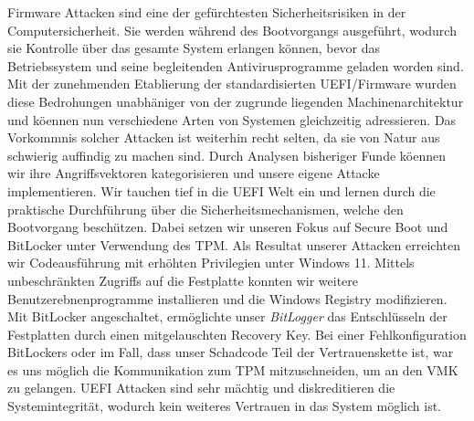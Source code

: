 Firmware Attacken sind eine der gef\"urchtesten Sicherheitsrisiken in der Computersicherheit.
Sie werden w\"ahrend des Bootvorgangs ausgef\"uhrt, wodurch sie Kontrolle \"uber das gesamte System erlangen k\"onnen, bevor das Betriebssystem und seine begleitenden Antivirusprogramme geladen worden sind.
Mit der zunehmenden Etablierung der standardisierten \acs{UEFI}\-/Firmware wurden diese Bedrohungen unabh\"aniger von der zugrunde liegenden Machinenarchitektur und k\"oennen nun verschiedene Arten von Systemen gleichzeitig adressieren.
Das Vorkommnis solcher Attacken ist weiterhin recht selten, da sie von Natur aus schwierig auffindig zu machen sind.
Durch Analysen bisheriger Funde k\"oennen wir ihre Angriffsvektoren kategorisieren und unsere eigene Attacke implementieren.
Wir tauchen tief in die \acs{UEFI} Welt ein und lernen durch die praktische Durchf\"uhrung \"uber die Sicherheitsmechanismen, welche den Bootvorgang besch\"utzen.
Dabei setzen wir unseren Fokus auf Secure Boot und BitLocker unter Verwendung des \acs{TPM}.
Als Resultat unserer Attacken erreichten wir Codeausf\"uhrung mit erh\"ohten Privilegien unter Windows 11.
Mittels unbeschr\"ankten Zugriffs auf die Festplatte konnten wir weitere Benutzerebnenprogramme installieren und die Windows Registry modifizieren.
Mit BitLocker angeschaltet, erm\"oglichte unser \emph{BitLogger} das Entschl\"usseln der Festplatten durch einen mitgelauschten Recovery Key.
Bei einer Fehlkonfiguration BitLockers oder im Fall, dass unser Schadcode Teil der Vertrauenskette ist, war es uns m\"oglich die Kommunikation zum \acs{TPM} mitzuschneiden, um an den \acs{VMK} zu gelangen.
\acs{UEFI} Attacken sind sehr m\"achtig und diskreditieren die Systemintegrit\"at, wodurch kein weiteres Vertrauen in das System m\"oglich ist.

\acresetall